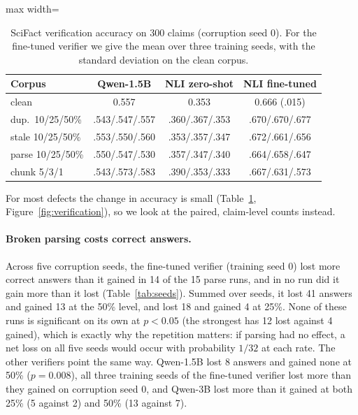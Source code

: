 \documentclass[11pt]{article}
\begin{document}
\begin{table}[t]
\centering\small
\setlength\tabcolsep{3.5pt}
\begin{adjustbox}{max width=\columnwidth}
\begin{tabular}{lccc}
\toprule
Corpus & Qwen-1.5B & NLI zero-shot & NLI fine-tuned \\
\midrule
clean & 0.557 & 0.353 & 0.666 (.015) \\
dup.\ 10/25/50\% & .543/.547/.557 & .360/.367/.353 & .670/.670/.677 \\
stale 10/25/50\% & .553/.550/.560 & .353/.357/.347 & .672/.661/.656 \\
parse 10/25/50\% & .550/.547/.530 & .357/.347/.340 & .664/.658/.647 \\
chunk 5/3/1 & .543/.573/.583 & .390/.353/.333 & .667/.631/.573 \\
\bottomrule
\end{tabular}
\end{adjustbox}
\caption{SciFact verification accuracy on 300 claims (corruption seed 0). For the fine-tuned verifier we
give the mean over three training seeds, with the standard deviation on the clean corpus.}
\label{tab:verification}
\end{table}

For most defects the change in accuracy is small (Table~\ref{tab:verification},
Figure~\ref{fig:verification}), so we look at the paired, claim-level counts instead.

\paragraph{Broken parsing costs correct answers.} Across five corruption seeds, the fine-tuned verifier
(training seed 0) lost more correct answers than it gained in 14 of the 15 parse runs, and in no run did it
gain more than it lost (Table~\ref{tab:seeds}). Summed over seeds, it lost 41 answers and gained 13 at the
50\% level, and lost 18 and gained 4 at 25\%. None of these runs is significant on its own at $p<0.05$
(the strongest has 12 lost against 4 gained), which is exactly why the repetition matters: if parsing had no
effect, a net loss on all five seeds would occur with probability $1/32$ at each rate. The other verifiers
point the same way. Qwen-1.5B lost 8 answers and gained none at 50\% ($p=0.008$), all three training seeds
of the fine-tuned verifier lost more than they gained on corruption seed 0, and Qwen-3B lost more than it
gained at both 25\% (5 against 2) and 50\% (13 against 7).
\end{document}
